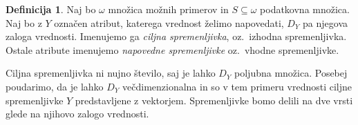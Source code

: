 \documentclass[12pt,a4paper,twoside]{article}
\theoremstyle{definition} %
\newtheorem{definicija}{Definicija}[section]
\theoremstyle{plain} %
\numberwithin{equation}{section}  %
\begin{document}
\begin{definicija}


Naj bo $\omega$ množica možnih primerov in $S \subseteq \omega$ podatkovna množica.
Naj bo z $Y$ označen atribut, katerega vrednost želimo napovedati, $D_Y$ pa njegova zaloga vrednosti.
Imenujemo ga \emph{ciljna spremenljivka}, oz.~izhodna spremenljivka.
Ostale atribute imenujemo \emph{napovedne spremenljivke} oz.~vhodne spremenljivke.
\end{definicija}

Ciljna spremenljivka ni nujno število, saj je lahko $D_Y$ poljubna množica.
Posebej poudarimo, da je lahko $D_Y$ večdimenzionalna in so v tem primeru vrednosti ciljne spremenljivke $Y$ predstavljene z vektorjem.
Spremenljivke bomo delili na dve vrsti glede na njihovo zalogo vrednosti.
\end{document}
